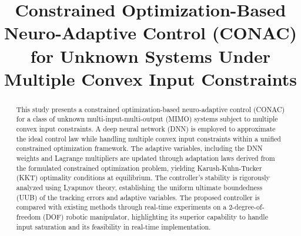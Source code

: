 \documentclass[letterpaper, journal]{IEEEtran}
\newcommand{\version}{0.9.3} %
\begin{document}
\linenumbers
{}

\title{
  Constrained Optimization-Based Neuro-Adaptive Control (CONAC) for Unknown Systems Under Multiple Convex Input Constraints
} %

\author{}
  

%
{}

\maketitle

\begin{abstract}
  This study presents a constrained optimization-based neuro-adaptive control (CONAC) for a class of unknown multi-input-multi-output (MIMO) systems subject to multiple convex input constraints. 
  A deep neural network (DNN) is employed to approximate the ideal control law while handling multiple convex input constraints within a unified constrained optimization framework.
  The adaptive variables, including the DNN weights and Lagrange multipliers are updated through adaptation laws derived from the formulated constrained optimization problem, yielding Karush-Kuhn-Tucker (KKT) optimality conditions at equilibrium.
  The controller's stability is rigorously analyzed using Lyapunov theory, establishing the uniform ultimate boundedness (UUB) of the tracking errors and adaptive variables.
  The proposed controller is compared with existing methods through real-time experiments on a 2-degree-of-freedom (DOF) robotic manipulator, highlighting its superior capability to handle input saturation and its feasibility in real-time implementation.
\end{abstract}
\end{document}
